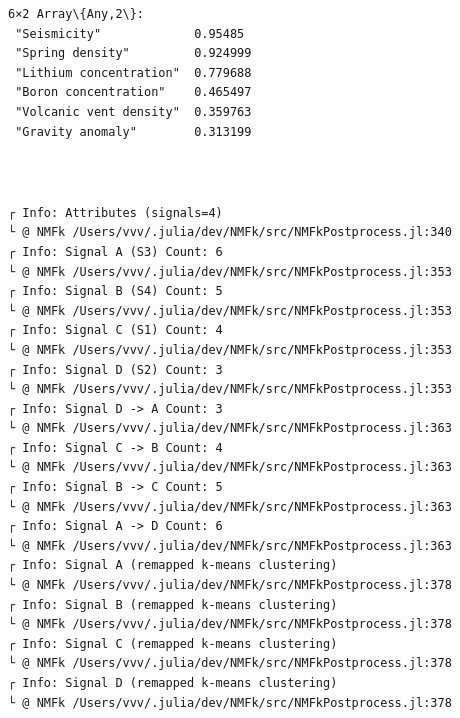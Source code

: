 \documentclass[11pt]{article}
\begin{document}
    
    
    \begin{Verbatim}[commandchars=\\\{\}]
6×2 Array\{Any,2\}:
 "Seismicity"             0.95485
 "Spring density"         0.924999
 "Lithium concentration"  0.779688
 "Boron concentration"    0.465497
 "Volcanic vent density"  0.359763
 "Gravity anomaly"        0.313199
    \end{Verbatim}

    
    \begin{center}
    \end{center}
    { \hspace*{\fill} \\}
    
    \begin{Verbatim}[commandchars=\\\{\}]

    \end{Verbatim}

    \begin{Verbatim}[commandchars=\\\{\}]
┌ Info: Attributes (signals=4)
└ @ NMFk /Users/vvv/.julia/dev/NMFk/src/NMFkPostprocess.jl:340
┌ Info: Signal A (S3) Count: 6
└ @ NMFk /Users/vvv/.julia/dev/NMFk/src/NMFkPostprocess.jl:353
┌ Info: Signal B (S4) Count: 5
└ @ NMFk /Users/vvv/.julia/dev/NMFk/src/NMFkPostprocess.jl:353
┌ Info: Signal C (S1) Count: 4
└ @ NMFk /Users/vvv/.julia/dev/NMFk/src/NMFkPostprocess.jl:353
┌ Info: Signal D (S2) Count: 3
└ @ NMFk /Users/vvv/.julia/dev/NMFk/src/NMFkPostprocess.jl:353
┌ Info: Signal D -> A Count: 3
└ @ NMFk /Users/vvv/.julia/dev/NMFk/src/NMFkPostprocess.jl:363
┌ Info: Signal C -> B Count: 4
└ @ NMFk /Users/vvv/.julia/dev/NMFk/src/NMFkPostprocess.jl:363
┌ Info: Signal B -> C Count: 5
└ @ NMFk /Users/vvv/.julia/dev/NMFk/src/NMFkPostprocess.jl:363
┌ Info: Signal A -> D Count: 6
└ @ NMFk /Users/vvv/.julia/dev/NMFk/src/NMFkPostprocess.jl:363
┌ Info: Signal A (remapped k-means clustering)
└ @ NMFk /Users/vvv/.julia/dev/NMFk/src/NMFkPostprocess.jl:378
┌ Info: Signal B (remapped k-means clustering)
└ @ NMFk /Users/vvv/.julia/dev/NMFk/src/NMFkPostprocess.jl:378
┌ Info: Signal C (remapped k-means clustering)
└ @ NMFk /Users/vvv/.julia/dev/NMFk/src/NMFkPostprocess.jl:378
┌ Info: Signal D (remapped k-means clustering)
└ @ NMFk /Users/vvv/.julia/dev/NMFk/src/NMFkPostprocess.jl:378
    \end{Verbatim}
\end{document}
